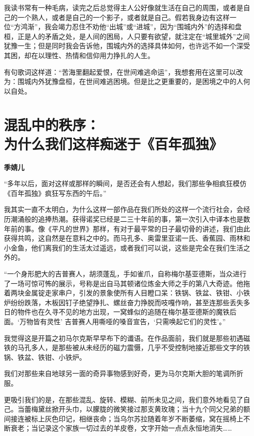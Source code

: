 \documentclass[openany,scheme = chinese, linespread = 1.5]{ctexbook}
\newcommand \name[1]{\begin{center} \kaishu \Large \bfseries #1 \end{center}}
\begin{document}
我读书常有一种毛病，读完之后总觉得主人公好像就生活在自己的周围，或者是自己的一个熟人，或者是自己的一个影子，或者就是自己。假若我身边有这样一位“方鸿渐”，我会竭力忍住不劝他“出城”或“进城”，因为“围城内外”的选择和盘桓，正是人的矛盾之处，是人间的困局，人只要有欲望，就注定在“城里城外”之间犹豫一生；但是同时我会告诉他，围城内外的选择具体如何，也许远不如一个深受其困，却在以理性、热情和信仰用力挣扎的人生。

有句歌词这样道：“苦海里翻起爱恨，在世间难逃命运”，我想套用在这里可以改为：围城内外犹豫盘桓，在世间难逃困境。但是比之更重要的，是困境之中的人何以自处。

\newpage
\section{混乱中的秩序：\\为什么我们这样痴迷于《百年孤独》}
\name{季婧儿}
 
“多年以后，面对这样或那样的瞬间，是否还会有人想起，我们那些争相疯狂模仿《百年孤独》疯狂写东西的午后。”

我其实一直不太明白，为什么这样一部作品在我们所处的这样一个流行社会，会经历潮涌般的追捧热潮。获得诺奖已经是二三十年前的事，第一次引入中译本也是数年前的事。像《平凡的世界》那样，有对于最平常的日子最切骨的讲述，我们由此获得共鸣，这自然是在意料之中的。而马孔多、奥雷里亚诺一氏、香蕉园、雨林和小金鱼，他们离我们的生活太过遥远，或者我们可以说，这些是完全在我们生活之外的。

“一个身形肥大的吉普赛人，胡须蓬乱，手如雀爪，自称梅尔基亚德斯，当众进行了一场可惊可怖的展示，号称是出自马其顿诸位炼金大师之手的第八大奇迹。他拖着两块金属锭走家串户，引发的景象使所有人目瞪口呆：铁锅、铁盆、铁钳、小铁炉纷纷跌落，木板因钉子绝望挣扎、螺丝奋力挣脱而吱嘎作响，甚至连那些丢失多日的物件也在久寻不见的地方出现，一窝蜂似的追随在梅尔基亚德斯的魔铁后面。‘万物皆有灵性’ 吉普赛人用嘶哑的嗓音宣告，‘只需唤起它们的灵性’。”

我觉得这是开篇之初马尔克斯早早布下的谶语。在作品面前，我们就是那些初遇磁铁的马孔多人，是那些被从未经历的磁力震慑，几乎不受控制地接近那些文字的铁锅、铁盆、铁钳、小铁炉。

我们对那些来自地球另一面的奇异事物感到好奇，更为马尔克斯大胆的笔调所折服。

更吸引我们的是，在那些混乱、旋转、模糊、前所未见之间，我们意外地看见了自己。当蕾梅黛丝掀开头巾，以朦胧的微笑接过那支黄玫瑰；当十九个同父兄弟的额间接连被标上灰色印记，相继丧命；当乌尔苏拉随着年岁不断萎缩，窝在摇椅上不断衰老；当记录这个家族一切过去的羊皮卷，文字开始一点点永恒地消失……
\end{document}
